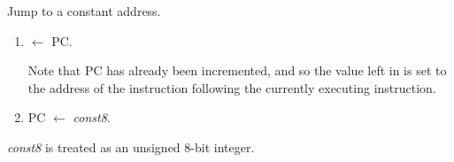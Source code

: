 


Jump to a constant address.

\begin{enumerate}

\item {} $\leftarrow$ {\sc PC}.

	Note that {\sc PC} has already been incremented, and so the
	value left in  is set to the address of the instruction
	following the currently executing instruction.

\item {\sc PC} $\leftarrow$ {\em const8}.

\end{enumerate}

{\em const8} is treated as an unsigned 8-bit integer.

